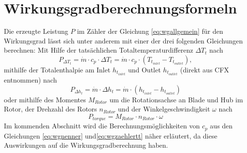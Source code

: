 \section{Wirkungsgradberechnungsformeln}
\label{sec:wirkungsgrade}
Die erzeugte Leistung $P$ im Zähler der Gleichung \ref{eq:wgallgemein} für den Wirkungsgrad  lässt sich unter anderem mit einer der drei folgenden Gleichungen berechnen:\newline
Mit Hilfe der tatsächlichen Totaltemperaturdifferenz $\Delta T_t$ nach
\begin{equation}
\label{eq:wgzaehlertt}
P_{\Delta T_t} = \dot m \cdot c_p \cdot \Delta T_t = \dot m \cdot c_p \cdot \left( T_{t_{inlet}}-T_{t_{outlet}} \right),
\end{equation}
mithilfe der Totalenthalpie am Inlet $h_{t_{inlet}}$ und Outlet $h_{t_{outlet}}$ (direkt aus CFX entnommen) nach
\begin{equation}
\label{eq:wgzaehlerht}
P_{\Delta h_t} = \dot m \cdot \Delta h_t = \dot m \cdot \left( h_{t_{inlet}}-h_{t_{outlet}} \right)
\end{equation}
oder mithilfe des Momentes $M_{Rotor}$ um die Rotationsachse an Blade und Hub im Rotor, der Drehzahl des Rotors $n_{Rotor}$ und der Winkelgeschwindigkeit $\omega$ nach 
\begin{equation}
\label{eq:wgzaehlertorque}
P_{torque} = M_{Rotor} \cdot n_{Rotor} \cdot \omega
\end{equation}
Im kommenden Abschnitt wird die Berechnungsmöglichkeiten von $c_p$ aus den Gleichungen \ref{eq:wgnenner} und\ref{eq:wgzaehlertt} näher erläutert, da diese Auswirkungen auf die Wirkungsgradberechnung haben.
